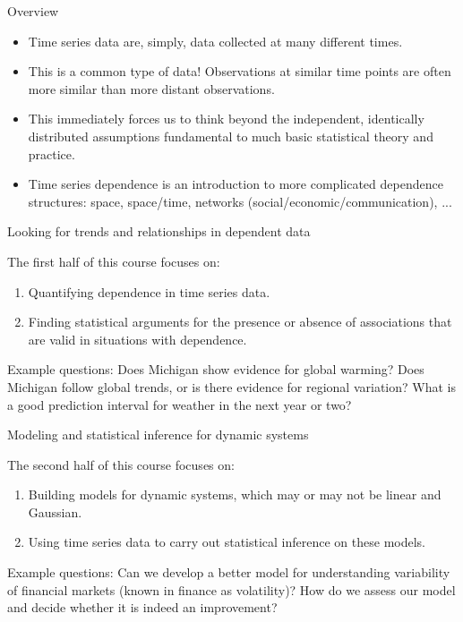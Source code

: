 \begin{frame}{Overview}

\begin{itemize}

\item Time series data are, simply, data collected at many different times. 

\item This is a common type of data! Observations at similar time points are often more similar than more distant observations. 

\item This immediately forces us to think beyond the independent, identically distributed assumptions fundamental to much basic statistical theory and practice. 

\item Time series dependence is an introduction to more complicated dependence structures: space, space/time, networks (social/economic/communication), ...

\end{itemize}

\end{frame}

\begin{frame}{Looking for trends and relationships in dependent data}

The first half of this course focuses on:

\begin{enumerate}

\item Quantifying dependence in time series data.

\item Finding statistical arguments for the presence or absence of associations that are valid in situations with dependence.

\end{enumerate}

Example questions: Does Michigan show evidence for global warming? Does Michigan follow global trends, or is there evidence for regional variation? What is a good prediction interval for weather in the next year or two?

\end{frame}

\begin{frame}{Modeling and statistical inference for dynamic systems}

The second half of this course focuses on:
\begin{enumerate}
\item
 Building models for dynamic systems, which may or may not be linear and Gaussian.
\item
Using time series data to carry out statistical inference on these models.
\end{enumerate}

Example questions: Can we develop a better model for understanding variability of financial markets (known in finance as volatility)? How do we assess our model and decide whether it is indeed an improvement?

\end{frame}

